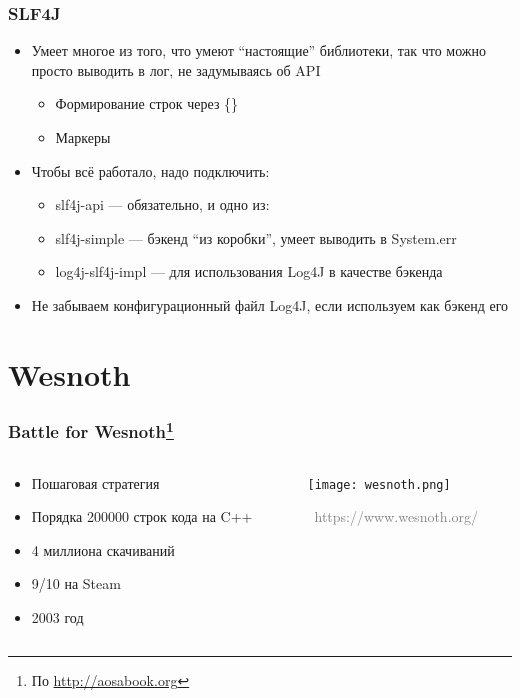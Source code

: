 \documentclass[xetex,mathserif,serif]{beamer}
\newcommand{\attribution}[1] {
	\vspace{-5mm}\begin{flushright}\begin{scriptsize}\textcolor{gray}{\textcopyright\, #1}\end{scriptsize}\end{flushright}
}
\begin{document}
	\begin{frame}
		\frametitle{SLF4J}
		\begin{itemize}
			\item Умеет многое из того, что умеют ``настоящие'' библиотеки, так что можно просто выводить в лог, не задумываясь об API
			\begin{itemize}
				\item Формирование строк через \{\}
				\item Маркеры
			\end{itemize}
			\item Чтобы всё работало, надо подключить:
			\begin{itemize}
				\item slf4j-api --- обязательно, и одно из:
				\item slf4j-simple --- бэкенд ``из коробки'', умеет выводить в System.err
				\item log4j-slf4j-impl --- для использования Log4J в качестве бэкенда
			\end{itemize}
			\item Не забываем конфигурационный файл Log4J, если используем как бэкенд его
		\end{itemize}
	\end{frame}

	\section{Wesnoth}

	\begin{frame}
		\frametitle{Battle for Wesnoth\footnote{\tiny{По \url{http://aosabook.org}}}}
		\begin{columns}
			\begin{column}{0.4\textwidth}
				\begin{itemize}
					\item Пошаговая стратегия
					\item Порядка 200000 строк кода на C++
					\item 4 миллиона скачиваний
					\item 9/10 на Steam
					\item 2003 год
				\end{itemize}
			\end{column}
			\begin{column}{0.6\textwidth}
				\texttt{[image: wesnoth.png]}
				\attribution{https://www.wesnoth.org/}
			\end{column}
		\end{columns}
	\end{frame}
\end{document}
